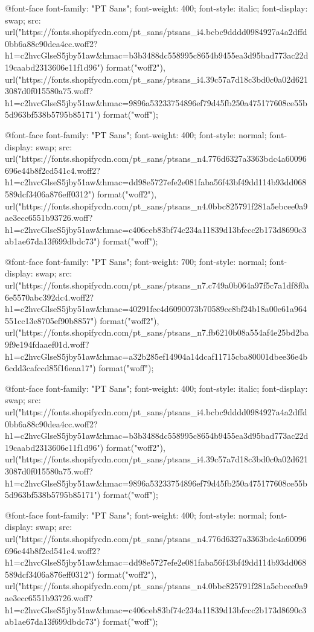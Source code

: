   
  
  @font-face {
  font-family: "PT Sans";
  font-weight: 400;
  font-style: italic;
  font-display: swap;
  src: url("https://fonts.shopifycdn.com/pt_sans/ptsans_i4.bcbc9dddd0984927a4a2dffd0bb6a88c90dea4cc.woff2?h1=c2hvcGlseS5jby51aw&hmac=b3b3488dc558995c8654b9455ea3d95bad773ac22d19caabd2313606e11f1d96") format("woff2"),
       url("https://fonts.shopifycdn.com/pt_sans/ptsans_i4.39c57a7d18c3bd0c0a02d6213087d0f015580a75.woff?h1=c2hvcGlseS5jby51aw&hmac=9896a53233754896ef79d45fb250a475177608ce55b5d963bf538b5795b85171") format("woff");
}

@font-face {
  font-family: "PT Sans";
  font-weight: 400;
  font-style: normal;
  font-display: swap;
  src: url("https://fonts.shopifycdn.com/pt_sans/ptsans_n4.776d6327a3363bdc4a60096696e44b8f2cd541c4.woff2?h1=c2hvcGlseS5jby51aw&hmac=dd98e5727efe2e081faba56f43bf49dd114b93dd068589dcf3406a876eff0312") format("woff2"),
       url("https://fonts.shopifycdn.com/pt_sans/ptsans_n4.0bbc825791f281a5ebcee0a9ae3ecc6551b93726.woff?h1=c2hvcGlseS5jby51aw&hmac=c406ceb83bf74c234a11839d13bfccc2b173d8690c3ab1ae67da13f699dbdc73") format("woff");
}

  @font-face {
  font-family: "PT Sans";
  font-weight: 700;
  font-style: normal;
  font-display: swap;
  src: url("https://fonts.shopifycdn.com/pt_sans/ptsans_n7.c749a0b064a97f5c7a1df8f0a6e5570abc392dc4.woff2?h1=c2hvcGlseS5jby51aw&hmac=40291fec4d6090073b70589cc8bf24b18a00e61a964551cc13e8705ef90b8857") format("woff2"),
       url("https://fonts.shopifycdn.com/pt_sans/ptsans_n7.fb6210b08a554af4e25bd2ba9f9e194fdaaef01d.woff?h1=c2hvcGlseS5jby51aw&hmac=a32b285ef14904a14dcaf11715cba80001dbee36e4b6cdd3cafccd85f16eaa17") format("woff");
}

  
  
  @font-face {
  font-family: "PT Sans";
  font-weight: 400;
  font-style: italic;
  font-display: swap;
  src: url("https://fonts.shopifycdn.com/pt_sans/ptsans_i4.bcbc9dddd0984927a4a2dffd0bb6a88c90dea4cc.woff2?h1=c2hvcGlseS5jby51aw&hmac=b3b3488dc558995c8654b9455ea3d95bad773ac22d19caabd2313606e11f1d96") format("woff2"),
       url("https://fonts.shopifycdn.com/pt_sans/ptsans_i4.39c57a7d18c3bd0c0a02d6213087d0f015580a75.woff?h1=c2hvcGlseS5jby51aw&hmac=9896a53233754896ef79d45fb250a475177608ce55b5d963bf538b5795b85171") format("woff");
}



  @font-face {
  font-family: "PT Sans";
  font-weight: 400;
  font-style: normal;
  font-display: swap;
  src: url("https://fonts.shopifycdn.com/pt_sans/ptsans_n4.776d6327a3363bdc4a60096696e44b8f2cd541c4.woff2?h1=c2hvcGlseS5jby51aw&hmac=dd98e5727efe2e081faba56f43bf49dd114b93dd068589dcf3406a876eff0312") format("woff2"),
       url("https://fonts.shopifycdn.com/pt_sans/ptsans_n4.0bbc825791f281a5ebcee0a9ae3ecc6551b93726.woff?h1=c2hvcGlseS5jby51aw&hmac=c406ceb83bf74c234a11839d13bfccc2b173d8690c3ab1ae67da13f699dbdc73") format("woff");
}

